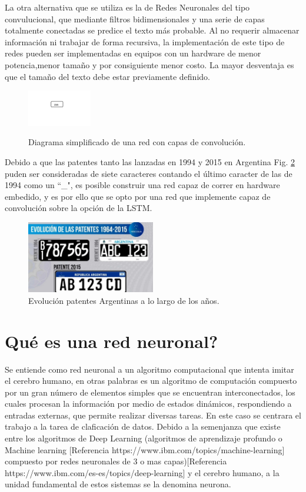 La otra alternativa que se utiliza es la de Redes Neuronales del tipo convulucional, que mediante filtros bidimensionales y una serie de capas totalmente conectadas se predice el texto más probable.
Al no requerir almacenar información ni trabajar de forma recursiva, la implementación
de este tipo de redes pueden ser implementadas en equipos con un hardware de menor potencia,menor tamaño y por consiguiente menor costo. La mayor desventaja es que el tamaño del texto debe estar previamente definido.
\begin{figure}[h]
    \centering
    \includegraphics[width=0.25\textwidth]{imgs/CNN-diagrama.jpg}
    \label{fig:diagrama-CNN}
    \caption{Diagrama simplificado de una red con capas de convolución.}
\end{figure}

Debido a que las patentes tanto las lanzadas en 1994 y 2015 en Argentina Fig. \ref{fig:patentes-arg} puden ser consideradas de siete caracteres contando el último caracter de las de 1994 como un ``\_", es posible construir una red capaz de correr en hardware embedido, y es por ello que se opto por una red que implemente capaz de convolución sobre la opción de la LSTM.

\begin{figure}[h]
    \centering
    \includegraphics[width=0.5\textwidth]{imgs/patentes-arg.png}
    \caption{Evolución patentes Argentinas a lo largo de los años.}
    \label{fig:patentes-arg}
\end{figure}


\section{Qué es una red neuronal?}

Se entiende como red neuronal a un algoritmo computacional que intenta imitar el cerebro humano, en otras palabras es un algoritmo de computación compuesto por un gran número de elementos simples que se
encuentran interconectados, los cuales procesan la información por medio de estados dinámicos, respondiendo a entradas externas, que permite realizar diversas tareas.
En este caso se centrara el trabajo a la tarea de claficación de datos.
Debido a la semenjanza que existe entre los algoritmos de Deep Learning (algoritmos de aprendizaje profundo o
Machine learning [Referencia https://www.ibm.com/topics/machine-learning] compuesto por redes neuronales
de 3 o mas capas)[Referencia https://www.ibm.com/es-es/topics/deep-learning] y el cerebro humano, a la
unidad fundamental de estos sistemas se la denomina neurona.


